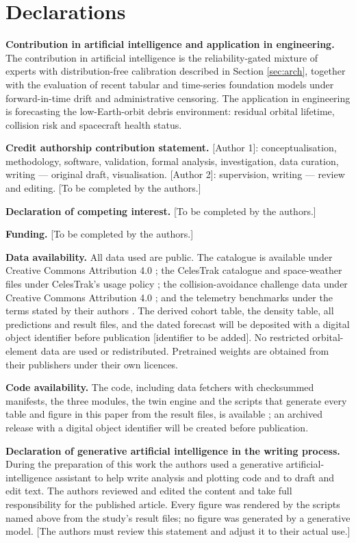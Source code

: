 \documentclass[3p,times]{elsarticle}
\begin{document}
\section*{Declarations}\label{declarations}

\textbf{Contribution in artificial intelligence and application in
engineering.} The contribution in artificial intelligence is the
reliability-gated mixture of experts with distribution-free calibration
described in Section \ref{sec:arch}, together with the evaluation of
recent tabular and time-series foundation models under forward-in-time
drift and administrative censoring. The application in engineering is
forecasting the low-Earth-orbit debris environment: residual orbital
lifetime, collision risk and spacecraft health status.

\textbf{Credit authorship contribution statement.} {[}Author 1{]}:
conceptualisation, methodology, software, validation, formal analysis,
investigation, data curation, writing --- original draft, visualisation.
{[}Author 2{]}: supervision, writing --- review and editing. {[}To be
completed by the authors.{]}

\textbf{Declaration of competing interest.} {[}To be completed by the
authors.{]}

\textbf{Funding.} {[}To be completed by the authors.{]}

\textbf{Data availability.} All data used are public. The catalogue is
available under Creative Commons Attribution 4.0
\citep{mcdowell2020gcat}; the CelesTrak catalogue and space-weather
files under CelesTrak's usage policy \citep{celestrak2026satcat}; the
collision-avoidance challenge data under Creative Commons Attribution
4.0 \citep{uriot2021cacdataset}; and the telemetry benchmarks under the
terms stated by their authors \citep{hundman2018, esaadb_dataset}. The
derived cohort table, the density table, all predictions and result
files, and the dated forecast will be deposited with a digital object
identifier before publication {[}identifier to be added{]}. No
restricted orbital-element data are used or redistributed. Pretrained
weights are obtained from their publishers under their own licences.

\textbf{Code availability.} The code, including data fetchers with
checksummed manifests, the three modules, the twin engine and the
scripts that generate every table and figure in this paper from the
result files, is available \citep{cosmos_software}; an archived release
with a digital object identifier will be created before publication.

\textbf{Declaration of generative artificial intelligence in the writing
process.} During the preparation of this work the authors used a
generative artificial-intelligence assistant to help write analysis and
plotting code and to draft and edit text. The authors reviewed and
edited the content and take full responsibility for the published
article. Every figure was rendered by the scripts named above from the
study's result files; no figure was generated by a generative model.
{[}The authors must review this statement and adjust it to their actual
use.{]}



\end{document}
